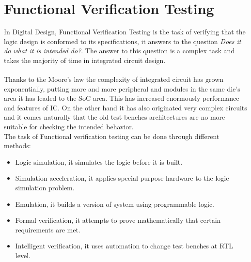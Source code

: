 \chapter{Functional Verification Testing}
\label{fvt}
In Digital Design, Functional Verification Testing is the task of verifying that the logic design is conformed to its specifications, it answers to the question \textit{Does it do what it is intended do?}. The answer to this question is a complex task and takes the majority of time in integrated circuit design.\\\\
Thanks to the Moore's law \cite{paper:1} the complexity of integrated circuit has grown exponentially, putting more and more peripheral and modules in the same die's area it has leaded to the SoC area. This has increased enormously performance and features of IC. On the other hand it has also originated very complex circuits and it comes naturally that the old test benches architectures are no more suitable for checking the intended behavior.\\

The task of Functional verification testing can be done through different methods:
\begin{itemize}
\item Logic simulation, it simulates the logic before it is built.
\item Simulation acceleration, it applies special purpose hardware to the logic simulation problem.
\item Emulation, it builds a version of system using programmable logic.
\item Formal verification, it attempts to prove mathematically that certain requirements are met.
\item Intelligent verification, it uses automation to change test benches at RTL level.
\end{itemize}


